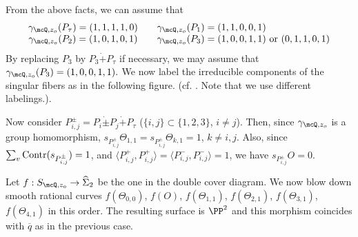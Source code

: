 From the above facts, we can assume that
\[
\begin{array}{ccl}
\gamma_{\mcQ, z_o} (P_{\tau})  =  (1, 1, 1, 1 , 0) & &
\gamma_{\mcQ, z_o} (P_1)  =  (1, 1, 0, 0, 1) \\
\gamma_{\mcQ, z_o} (P_2)  =  (1, 0, 1, 0, 1) & &
\gamma_{\mcQ, z_o} (P_3)  =  (1, 0, 0,1, 1)  \,\, \mbox{\rm or} \,\,(0, 1, 1, 0, 1)
\end{array}
\]
By replacing $P_3$  by $P_3\dot+P_\tau$  if necessary, we may assume that $\gamma_{\mcQ, z_o} (P_3)  =  (1, 0, 0,1, 1).$ We now label the irreducible components of the singular fibers as in the following figure. (cf.
\cite[No. 24, p. 90]{tokunaga12}. Note that we use different labelings.). 

%
%





Now consider $P_{i,j}^\pm=P_i\dot\pm P_j\dot+P_\tau$ ($\{i,j\}\subset\{1,2,3\}$, $i\not=j$). Then, since $\gamma_{\mcQ, z_o}$ is a group homomorphism, $s_{P_{i,j}^\pm}\Theta_{1,1}=s_{P_{i,j}^\pm}\Theta_{k,1}=1$, $k\not=i,j$. Also, since $\sum_v{\rm Contr}(s_{P_{i,j}^\pm})=1$, and $\langle P_{i,j}^+, P_{i,j}^+\rangle=\langle P_{i,j}^-, P_{i,j}^-\rangle=1$, we have $s_{P_{i,j}^\pm}O=0$.

Let $f: S_{\mcQ, z_o} \to \widehat{\Sigma}_2$ be the one in the
double cover diagram.
We now blow down  smooth rational curves $f(\Theta_{0, 0})$, $f(O)$, $f(\Theta_{1, 1})$,
$f(\Theta_{2, 1})$, $f(\Theta_{3, 1})$, $f(\Theta_{4, 1})$  in this order. The resulting surface is $\PP^2$ and this morphism coincides with $\overline q$ as in the previous case.

